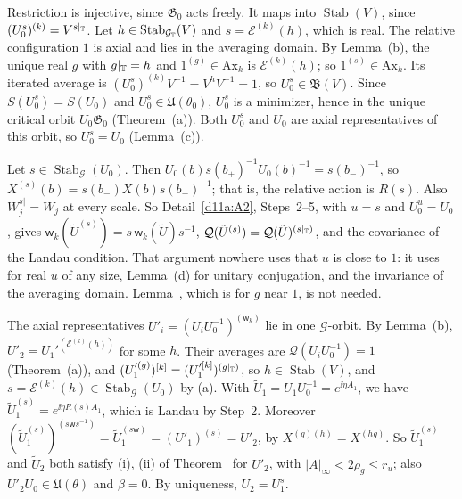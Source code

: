 \begin{detail}\label{d11a:E3}
\begin{step}
Restriction is injective, since $\mathfrak G_0$ acts freely. It maps into $\operatorname{Stab}(V)$, since $(U_0^s)^{(k)}=V^{s|_\mathbb T}$. Let $h\in\operatorname{Stab}_{\mathcal G_\mathbb T}(V)$ and $s=\mathcal E^{(k)}(h)$, which is real. The relative configuration $1$ is axial and lies in the averaging domain. By Lemma~(b), the unique real $g$ with $g|_\mathbb T=h$ and $1^{(g)}\in\mathrm{Ax}_k$ is $\mathcal E^{(k)}(h)$; so $1^{(s)}\in\mathrm{Ax}_k$. Its iterated average is $(U_0^s)^{(k)}V^{-1}=V^hV^{-1}=1$, so $U_0^s\in\mathfrak B(V)$. Since $S(U_0^s)=S(U_0)$ and $U_0^s\in\mathfrak U(\theta_0)$, $U_0^s$ is a minimizer, hence in the unique critical orbit $U_0\mathfrak G_0$ (Theorem~(a)). Both $U_0^s$ and $U_0$ are axial representatives of this orbit, so $U_0^s=U_0$ (Lemma~(c)).
\end{step}
\begin{step}
Let $s\in\operatorname{Stab}_{\mathcal G}(U_0)$. Then $U_0(b)s(b_+)^{-1}U_0(b)^{-1}=s(b_-)^{-1}$, so $X^{(s)}(b)=s(b_-)X(b)s(b_-)^{-1}$; that is, the relative action is $R(s)$. Also $W_j^{s|}=W_j$ at every scale. So Detail~\ref{d11a:A2}, Steps~2--5, with $u=s$ and $U_0^u=U_0$, gives $\mathsf w_k(\tilde U^{(s)})=s\,\mathsf w_k(\tilde U)s^{-1}$, $\mathcal Q(\tilde U^{(s)})=\mathcal Q(\tilde U)^{(s|_\mathbb T)}$, and the covariance of the Landau condition. That argument nowhere uses that $u$ is close to $1$: it uses  for real $u$ of any size, Lemma~(d) for unitary conjugation, and the invariance of the averaging domain. Lemma~, which is for $g$ near $1$, is not needed.
\end{step}
\begin{step}[(b)]
The axial representatives $U'_i=(U_iU_0^{-1})^{(\mathsf w_k)}$ lie in one $\mathcal G$-orbit. By Lemma~(b), $U'_2=U_1'^{(\mathcal E^{(k)}(h))}$ for some $h$. Their averages are $\mathcal Q(U_iU_0^{-1})=1$ (Theorem~(a)), and $(U_1'^{(g)})^{[k]}=(U_1'^{[k]})^{(g|_\mathbb T)}$, so $h\in\operatorname{Stab}(V)$, and $s=\mathcal E^{(k)}(h)\in\operatorname{Stab}_{\mathcal G}(U_0)$ by (a). With $\tilde U_1=U_1U_0^{-1}=e^{\ii\eta A_1}$, we have $\tilde U_1^{(s)}=e^{\ii\eta R(s)A_1}$, which is Landau by Step~2. Moreover $(\tilde U_1^{(s)})^{(s\mathsf w s^{-1})}=\tilde U_1^{(s\mathsf w)}=(U'_1)^{(s)}=U'_2$, by $X^{(g)(h)}=X^{(hg)}$. So $\tilde U_1^{(s)}$ and $\tilde U_2$ both satisfy (i), (ii) of Theorem~ for $U'_2$, with $|A|_\infty<2\rho_g\le r_u$; also $U'_2U_0\in\mathfrak U(\theta)$ and $\beta=0$. By uniqueness, $U_2=U_1^s$.
\end{step}
\end{detail}

